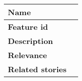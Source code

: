 	\begin{tabular}{ | p{3cm} | p{12cm} |}
	\hline
	\textbf{Name} 				& \\ \hline
	\textbf{Feature id} 		& \\ \hline
	\textbf{Description} 		& \\ \hline
	\textbf{Relevance} 			& \\ \hline
	\textbf{Related stories} 	& \\ \hline
	\end{tabular}
